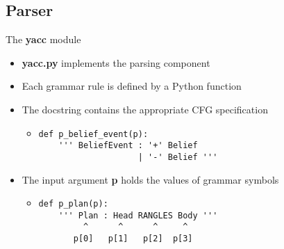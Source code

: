 \subsection{Parser}
\begin{frame}[fragile]{The \textbf{yacc} module}
  \begin{itemize}
    \item \textbf{yacc.py} implements the parsing component
\N
    \item Each grammar rule is defined by a Python function
\n
    \item The docstring contains the appropriate CFG specification
\n
    \begin{itemize}
     \item 
      \begin{verbatim} 
def p_belief_event(p):
    ''' BeliefEvent : '+' Belief 
                    | '-' Belief ''' \end{verbatim}
    \end{itemize}
\n
    \item The input argument \textbf{p} holds the values of grammar symbols
\n
    \begin{itemize}
      \item 
      \begin{verbatim} 
def p_plan(p):
    ''' Plan : Head RANGLES Body ''' 
         ^      ^      ^     ^
       p[0]   p[1]   p[2]  p[3] \end{verbatim}
    \end{itemize}
  \end{itemize}
%
\N\N
\end{frame}
